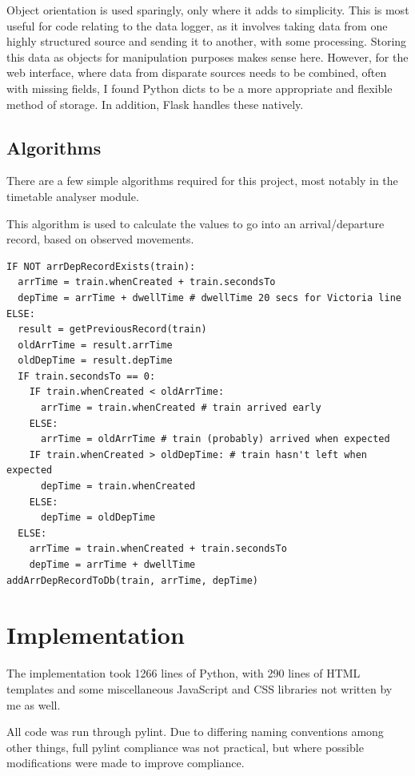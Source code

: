 \documentclass[a4paper,12pt]{report}
\begin{document}
Object orientation is used sparingly, only where it adds to simplicity. This is
most useful for code relating to the data logger, as it involves taking data
from one highly structured source and sending it to another, with some
processing. Storing this data as objects for manipulation purposes makes sense
here. However, for the web interface, where data from disparate sources needs
to be combined, often with missing fields, I found Python dicts to be a more
appropriate and flexible method of storage. In addition, Flask handles these
natively.

\section{Algorithms}

There are a few simple algorithms required for this project, most notably in
the timetable analyser module.

This algorithm is used to calculate the values to go into an arrival/departure
record, based on observed movements.

\begin{lstlisting}
IF NOT arrDepRecordExists(train):
  arrTime = train.whenCreated + train.secondsTo
  depTime = arrTime + dwellTime # dwellTime 20 secs for Victoria line
ELSE:
  result = getPreviousRecord(train)
  oldArrTime = result.arrTime
  oldDepTime = result.depTime
  IF train.secondsTo == 0:
    IF train.whenCreated < oldArrTime:
      arrTime = train.whenCreated # train arrived early
    ELSE:
      arrTime = oldArrTime # train (probably) arrived when expected
    IF train.whenCreated > oldDepTime: # train hasn't left when expected
      depTime = train.whenCreated
    ELSE:
      depTime = oldDepTime
  ELSE:
    arrTime = train.whenCreated + train.secondsTo
    depTime = arrTime + dwellTime
addArrDepRecordToDb(train, arrTime, depTime)
\end{lstlisting}

\chapter{Implementation}

The implementation took 1266 lines of Python, with 290 lines of HTML templates
and some miscellaneous JavaScript and CSS libraries not written by me as well.

All code was run through pylint. Due to differing naming conventions among
other things, full pylint compliance was not practical, but where possible
modifications were made to improve compliance.
\end{document}
